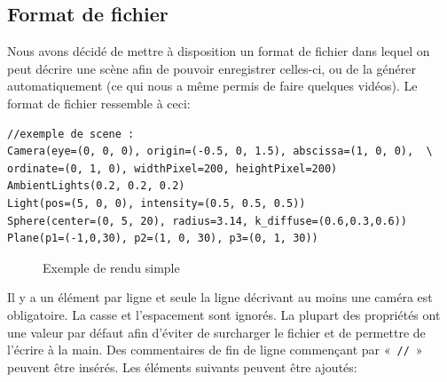 \documentclass[a4paper]{article}
\begin{document}
  \subsection{Format de fichier}
    Nous avons décidé de mettre à disposition un format de fichier dans lequel
    on peut décrire une scène afin de pouvoir enregistrer celles-ci, ou de la
    générer automatiquement (ce qui nous a même permis de faire quelques
    vidéos).
    Le format de fichier ressemble à ceci:
    \begin{lstlisting}[caption=Exemple de fichier associé à la figure
    \ref{fig:rendusimple}]
//exemple de scene :
Camera(eye=(0, 0, 0), origin=(-0.5, 0, 1.5), abscissa=(1, 0, 0),  \
ordinate=(0, 1, 0), widthPixel=200, heightPixel=200)
AmbientLights(0.2, 0.2, 0.2)
Light(pos=(5, 0, 0), intensity=(0.5, 0.5, 0.5))
Sphere(center=(0, 5, 20), radius=3.14, k_diffuse=(0.6,0.3,0.6))
Plane(p1=(-1,0,30), p2=(1, 0, 30), p3=(0, 1, 30))
    \end{lstlisting}
    \begin{figure}[h]
      \caption{Exemple de rendu simple\label{fig:rendusimple}}
    \end{figure}
    Il y a un élément par ligne et seule la ligne décrivant au moins une caméra
    est obligatoire. La casse et l'espacement sont ignorés. La plupart des
    propriétés ont une valeur par défaut afin d'éviter de surcharger le
    fichier et de permettre de l'écrire à la main. Des commentaires de fin de
    ligne commençant par «~\verb+//+~» peuvent être insérés.
    Les éléments suivants peuvent être ajoutés:
\end{document}
